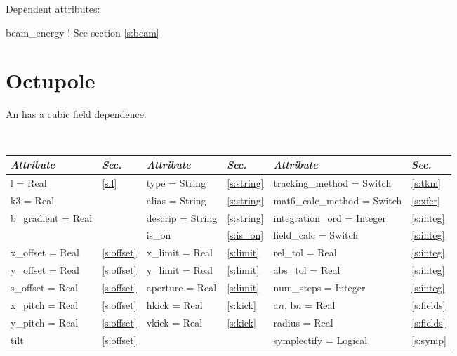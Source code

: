 \vskip0.05in \noindent
Dependent attributes:
\begin{example}
  beam\_energy  ! See section \ref{s:beam}
\end{example}

\section{Octupole}
\label{s:oct}

An  has a cubic field dependence.

\toffset
\begin{center}
\tt
\begin{tabular}{|l|l||l|l||l|l|} \hline
  {\sl Attribute} & {\sl Sec.}  & {\sl Attribute} & {\sl Sec.} & {\sl Attribute} & {\sl Sec.} \\ \hline
  l        = Real       & \ref{s:l}      & type = String      & \ref{s:string} & tracking\_method = Switch   & \ref{s:tkm}   \\ \hline
  k3       = Real       &                & alias = String     & \ref{s:string} & mat6\_calc\_method = Switch & \ref{s:xfer}  \\ \hline
  b\_gradient = Real    &                & descrip = String   & \ref{s:string} & integration\_ord = Integer  & \ref{s:integ} \\ \hline
                        &                & is\_on             & \ref{s:is_on}  & field\_calc = Switch        & \ref{s:integ} \\ \hline
  x\_offset  = Real     & \ref{s:offset} & x\_limit = Real    & \ref{s:limit}  & rel\_tol = Real             & \ref{s:integ} \\ \hline
  y\_offset  = Real     & \ref{s:offset} & y\_limit = Real    & \ref{s:limit}  & abs\_tol = Real             & \ref{s:integ} \\ \hline
  s\_offset  = Real     & \ref{s:offset} & aperture = Real    & \ref{s:limit}  & num\_steps = Integer        & \ref{s:integ} \\ \hline
  x\_pitch = Real       & \ref{s:offset} & hkick    = Real    & \ref{s:kick}   & a$n$, b$n$ = Real           & \ref{s:fields}\\ \hline
  y\_pitch = Real       & \ref{s:offset} & vkick    = Real    & \ref{s:kick}   & radius = Real               & \ref{s:fields}\\ \hline
  tilt                  & \ref{s:offset} &                    &                & symplectify = Logical       & \ref{s:symp}  \\ \hline
\end{tabular}
\end{center}
\toffset

